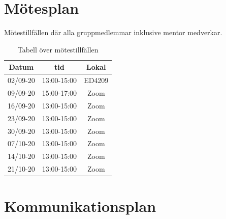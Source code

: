 \documentclass[a4paper]{article}
\begin{document}
\section{Mötesplan}

Mötestillfällen där alla gruppmedlemmar inklusive mentor medverkar.

\begin{table}[H]
    \begin{center}
        \begin{tabular}{ |c|c|c| }\hline
            Datum & tid & Lokal \\\hline\hline
            02/09-20 & 13:00-15:00 & ED4209 \\\hline
            09/09-20 & 15:00-17:00 & Zoom \\\hline
            16/09-20 & 13:00-15:00 & Zoom \\\hline
            23/09-20 & 13:00-15:00 & Zoom \\\hline
            30/09-20 & 13:00-15:00 & Zoom \\\hline
            07/10-20 & 13:00-15:00 & Zoom \\\hline
            14/10-20 & 13:00-15:00 & Zoom \\\hline
            21/10-20 & 13:00-15:00 & Zoom \\\hline
        \end{tabular}
        \caption{Tabell över mötestillfällen}
        \label{table:motesplan}
    \end{center}
\end{table}

\section{Kommunikationsplan}
\end{document}

